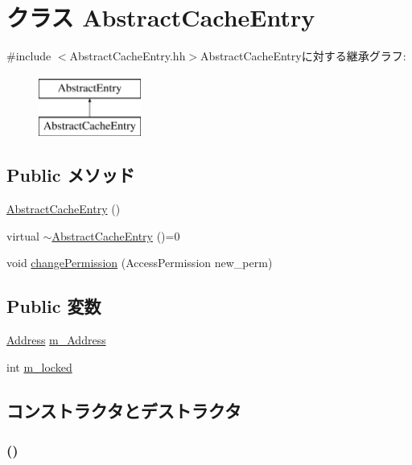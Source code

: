 \hypertarget{classAbstractCacheEntry}{
\section{クラス AbstractCacheEntry}
\label{classAbstractCacheEntry}
}


{\ttfamily \#include $<$AbstractCacheEntry.hh$>$}AbstractCacheEntryに対する継承グラフ:\begin{figure}[H]
\begin{center}
\leavevmode
\includegraphics[height=2cm]{classAbstractCacheEntry}
\end{center}
\end{figure}
\subsection*{Public メソッド}
\begin{DoxyCompactItemize}
\item 
\hyperlink{classAbstractCacheEntry_a077d24fc90a7ce61ba745b6d64d14967}{AbstractCacheEntry} ()
\item 
virtual \hyperlink{classAbstractCacheEntry_a10ab46a60152e0b3e6668a6f1f9f52e5}{$\sim$AbstractCacheEntry} ()=0
\item 
void \hyperlink{classAbstractCacheEntry_ac3f081af818286da737aac954875dd19}{changePermission} (AccessPermission new\_\-perm)
\end{DoxyCompactItemize}
\subsection*{Public 変数}
\begin{DoxyCompactItemize}
\item 
\hyperlink{classAddress}{Address} \hyperlink{classAbstractCacheEntry_ab635563c3a8accc6501e891059954ef2}{m\_\-Address}
\item 
int \hyperlink{classAbstractCacheEntry_a512dafa8354b9b621e1c022db0800cc0}{m\_\-locked}
\end{DoxyCompactItemize}


\subsection{コンストラクタとデストラクタ}
\hypertarget{classAbstractCacheEntry_a077d24fc90a7ce61ba745b6d64d14967}{
\subsubsection[{AbstractCacheEntry}]{ ()}}
\label{classAbstractCacheEntry_a077d24fc90a7ce61ba745b6d64d14967}



